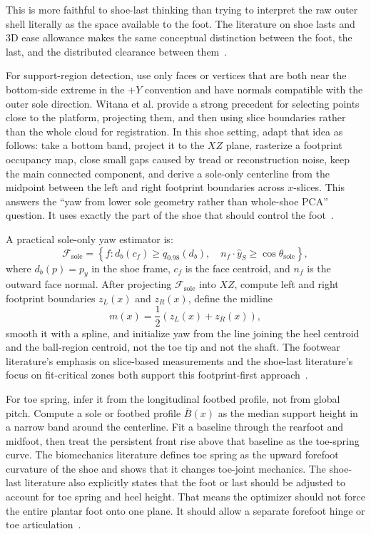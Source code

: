 \documentclass[11pt]{article}
\begin{document}
This is more faithful to shoe-last thinking than trying to interpret the raw outer shell literally as the space available to the foot. The literature on shoe lasts and 3D ease allowance makes the same conceptual distinction between the foot, the last, and the distributed clearance between them~\cite{bao-last,ease-allowance}.

For support-region detection, use only faces or vertices that are both near the bottom-side extreme in the $+Y$ convention and have normals compatible with the outer sole direction. Witana et al. provide a strong precedent for selecting points close to the platform, projecting them, and then using slice boundaries rather than the whole cloud for registration. In this shoe setting, adapt that idea as follows: take a bottom band, project it to the $X Z$ plane, rasterize a footprint occupancy map, close small gaps caused by tread or reconstruction noise, keep the main connected component, and derive a sole-only centerline from the midpoint between the left and right footprint boundaries across $x$-slices. This answers the ``yaw from lower sole geometry rather than whole-shoe PCA'' question. It uses exactly the part of the shoe that should control the foot~\cite{witana-foot-measurements}.

A practical sole-only yaw estimator is:
\begin{equation}
\mathcal{F}_{\mathrm{sole}} =
\left\{
f :
d_b(c_f) \ge q_{0.98}(d_b),
\quad
n_f \cdot \hat{y}_S \ge \cos \theta_{\mathrm{sole}}
\right\},
\end{equation}
where $d_b(p)=p_y$ in the shoe frame, $c_f$ is the face centroid, and $n_f$ is the outward face normal. After projecting $\mathcal{F}_{\mathrm{sole}}$ into $X Z$, compute left and right footprint boundaries $z_L(x)$ and $z_R(x)$, define the midline
\begin{equation}
m(x)=\frac{1}{2}\left(z_L(x)+z_R(x)\right),
\end{equation}
smooth it with a spline, and initialize yaw from the line joining the heel centroid and the ball-region centroid, not the toe tip and not the shaft. The footwear literature's emphasis on slice-based measurements and the shoe-last literature's focus on fit-critical zones both support this footprint-first approach~\cite{cad-last,fitness-lasts,witana-foot-measurements}.

For toe spring, infer it from the longitudinal footbed profile, not from global pitch. Compute a sole or footbed profile $\bar{B}(x)$ as the median support height in a narrow band around the centerline. Fit a baseline through the rearfoot and midfoot, then treat the persistent front rise above that baseline as the toe-spring curve. The biomechanics literature defines toe spring as the upward forefoot curvature of the shoe and shows that it changes toe-joint mechanics. The shoe-last literature also explicitly states that the foot or last should be adjusted to account for toe spring and heel height. That means the optimizer should not force the entire plantar foot onto one plane. It should allow a separate forefoot hinge or toe articulation~\cite{cad-foot-scan,toe-spring,rollover,supr-foot}.
\end{document}
